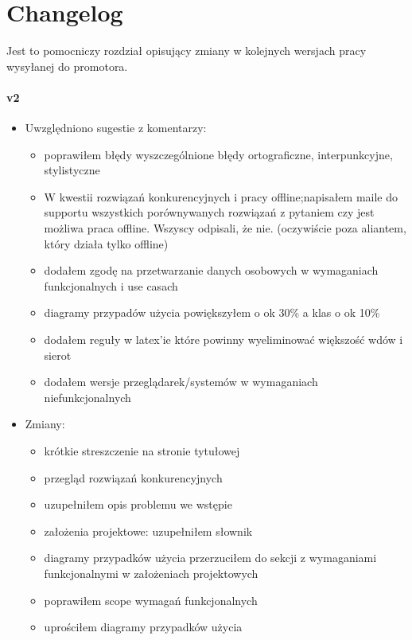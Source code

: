 \chapter*{Changelog}\label{ch:changelog}

Jest to pomocniczy rozdział opisujący zmiany w kolejnych wersjach pracy wysyłanej do promotora.

\subsubsection{v2}
\begin{itemize}
\item Uwzględniono sugestie z komentarzy:
    \begin{itemize}
	\item poprawiłem błędy wyszczególnione błędy ortograficzne, interpunkcyjne, stylistyczne
	\item W kwestii rozwiązań konkurencyjnych i pracy offline;napisałem maile do supportu wszystkich porównywanych rozwiązań z pytaniem czy jest możliwa praca offline. Wszyscy odpisali, że nie. (oczywiście poza aliantem, który działa tylko offline)
	\item dodałem zgodę na przetwarzanie danych osobowych w wymaganiach funkcjonalnych i use casach
	\item diagramy przypadów użycia powiększyłem o ok 30\% a klas o ok 10\%
	\item dodałem reguły w latex'ie które powinny wyeliminować większość wdów i sierot
	\item dodałem wersje przeglądarek/systemów w wymaganiach niefunkcjonalnych
	\end{itemize}
\item Zmiany:
    \begin{itemize}
	\item krótkie streszczenie na stronie tytułowej
	\item przegląd rozwiązań konkurencyjnych
	\item uzupełniłem opis problemu we wstępie
	\item założenia projektowe: uzupełniłem słownik
	\item diagramy przypadków użycia przerzuciłem do sekcji z wymaganiami funkcjonalnymi w założeniach projektowych
	\item poprawiłem scope wymagań funkcjonalnych
	\item uprościłem diagramy przypadków użycia

\end{itemize}
\end{itemize}
